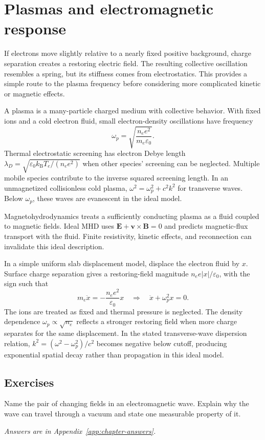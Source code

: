 \documentclass[11pt,oneside]{book}
\newcommand{\vect}[1]{\boldsymbol{#1}}
\newcommand{\kb}{k_{\mathrm B}}
\newcommand{\eps}{\varepsilon_0}
\theoremstyle{reviewstyle}
\newcommand{\learningcheck}[1]{\subsection*{Exercises}\noindent #1\par\smallskip\noindent\emph{Answers are in Appendix~\ref{app:chapter-answers}.}}
\begin{document}
\section{Plasmas and electromagnetic response}
If electrons move slightly relative to a nearly fixed positive background, charge separation creates a restoring electric field. The resulting collective oscillation resembles a spring, but its stiffness comes from electrostatics. This provides a simple route to the plasma frequency before considering more complicated kinetic or magnetic effects.

A plasma is a many-particle charged medium with collective behavior. With fixed ions and a cold electron fluid, small electron-density oscillations have frequency
\begin{equation}\omega_p=\sqrt{\frac{n_ee^2}{m_e\eps}}.\end{equation}
Thermal electrostatic screening has electron Debye length
$\lambda_D=\sqrt{\eps\kb T_e/(n_ee^2)}$ when other species' screening can be neglected. Multiple mobile species contribute to the inverse squared screening length. In an unmagnetized collisionless cold plasma,
$\omega^2=\omega_p^2+c^2k^2$ for transverse waves. Below $\omega_p$, these waves are evanescent in the ideal model.

Magnetohydrodynamics treats a sufficiently conducting plasma as a fluid coupled to magnetic fields. Ideal MHD uses $\vect E+\vect v\times\vect B=0$ and predicts magnetic-flux transport with the fluid. Finite resistivity, kinetic effects, and reconnection can invalidate this ideal description.

In a simple uniform slab displacement model, displace the electron fluid by $x$. Surface charge separation gives a restoring-field magnitude $n_ee|x|/\eps$, with the sign such that
\begin{equation}
m_e\ddot x=-\frac{n_ee^2}{\eps}x
\quad\Longrightarrow\quad \ddot x+\omega_p^2x=0.
\end{equation}
The ions are treated as fixed and thermal pressure is neglected. The density dependence $\omega_p\propto\sqrt{n_e}$ reflects a stronger restoring field when more charge separates for the same displacement. In the stated transverse-wave dispersion relation, $k^2=(\omega^2-\omega_p^2)/c^2$ becomes negative below cutoff, producing exponential spatial decay rather than propagation in this ideal model.

\learningcheck{Name the pair of changing fields in an electromagnetic wave. Explain why the wave can travel through a vacuum and state one measurable property of it.}
\end{document}
